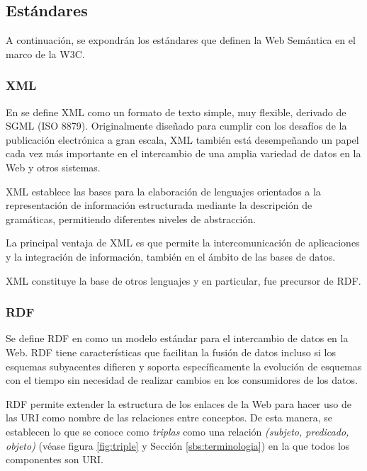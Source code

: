 



\subsection{Estándares}

A continuación, se expondrán los estándares que definen la Web Semántica en el
marco de la \acs{W3C}. 

\subsubsection{\acf{XML}}

En \cite{XML} se define \acs{XML} como un formato de texto simple, muy
  flexible, derivado de \acf{SGML} (ISO 8879). Originalmente diseñado para cumplir con
los desafíos de la publicación electrónica a gran escala, \acs{XML} también está
  desempeñando un papel cada vez más importante en el intercambio de una amplia
  variedad de datos en la Web y otros sistemas.

\acs{XML} establece las bases para la elaboración de lenguajes orientados a la
representación de información estructurada mediante la descripción de
gramáticas, permitiendo diferentes niveles de abstracción. 

La principal ventaja de \acs{XML} es que permite la intercomunicación de
aplicaciones y la integración de información, también en el ámbito de las bases
de datos. 

\acs{XML} constituye la base de otros lenguajes y en particular, fue precursor
de \acs{RDF}. 


\subsubsection{\acf{RDF}}

Se define \acs{RDF} en \cite{RDF} como un modelo estándar para el
  intercambio de datos en la Web. \acs{RDF} tiene características que facilitan
  la fusión de datos incluso si los esquemas subyacentes difieren y soporta
  específicamente la evolución de esquemas con el tiempo sin necesidad de
  realizar cambios en los consumidores de los datos.


\acs{RDF} permite extender la estructura de los enlaces de la Web para hacer uso
de las \acs{URI} como nombre de las relaciones entre conceptos. De esta manera,
se establecen lo que se conoce como \textit{triplas} como una relación
\textit{(subjeto, predicado, objeto)} (véase figura \ref{fig:triple} y Sección \ref{sbs:terminologia}) en la que todos los componentes son
\acs{URI}. 


